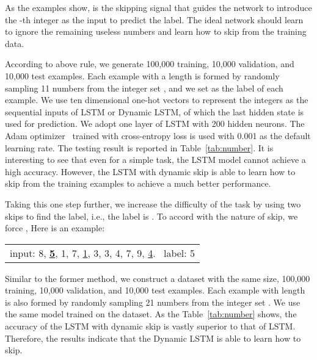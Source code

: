 \documentclass[letterpaper]{article} \usepackage{aaai19}  \usepackage{times}  \usepackage{helvet}  \usepackage{courier}  \usepackage{url}  \usepackage{graphicx}  \usepackage{amsmath}
\begin{document}
As the examples show,  is the skipping signal that guides the network to introduce the -th integer as the input to predict the label. The ideal network should learn to ignore the remaining useless numbers and learn how to skip from the training data.

According to above rule, we generate 100,000 training, 10,000 validation, and 10,000 test examples. Each example with a length  is formed by randomly sampling 11 numbers from the integer set , and we set  as the label of each example. We use ten dimensional one-hot vectors to represent the integers as the sequential inputs of LSTM or Dynamic LSTM, of which the last hidden state is used for prediction. We adopt one layer of LSTM with 200 hidden neurons. The Adam optimizer~\cite{kingma2014adam} trained with cross-entropy loss is used with 0.001 as the default learning rate. The testing result is reported in Table~\ref{tab:number}. It is interesting to see that even for a simple task, the LSTM model cannot achieve a high accuracy. However, the LSTM with dynamic skip is able to learn how to skip from the training examples to achieve a much better performance.

Taking this one step further, we increase the difficulty of the task by using two skips to find the label, i.e., the label is . To accord with the nature of skip, we force , Here is an example:
\begin{table}[h]
\centering
\begin{tabular}{c}
  input: 8, \textbf{\underline5}, 1, 7, \underline1, 3, 3, 4, 7, 9, \underline4. \ label: 5
\end{tabular}
\end{table}

Similar to the former method, we construct a dataset with the same size, 100,000 training, 10,000 validation, and 10,000 test examples. Each example with length  is also formed by randomly sampling 21 numbers from the integer set . We use the same model trained on the dataset. As the Table~\ref{tab:number} shows, the accuracy of the LSTM with dynamic skip is vastly superior to that of LSTM. Therefore, the results indicate that the Dynamic LSTM is able to learn how to skip.
\end{document}
